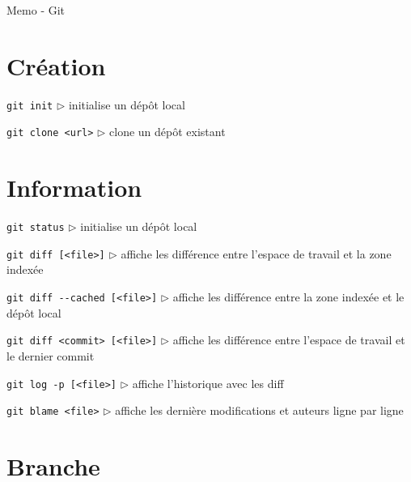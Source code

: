 \documentclass[a4paper,oneside,twocolumn]{article}
\begin{document}
\begin{center}
	\huge Memo - Git
\end{center}


\vspace{-3mm}
\section{Création}
\vspace{-2mm}

\noindent\verb?git init?\linebreak
$\triangleright$ initialise un dépôt local

\noindent\verb?git clone <url>?\linebreak
$\triangleright$ clone un dépôt existant

\vspace{-3mm}
\section{Information}
\vspace{-2mm}

\noindent\verb?git status?\linebreak
$\triangleright$ initialise un dépôt local

\noindent\verb?git diff [<file>]?\linebreak
$\triangleright$ affiche les différence entre l'espace de travail et la zone indexée

\noindent\verb?git diff --cached [<file>]?\linebreak
$\triangleright$ affiche les différence entre la zone indexée et le dépôt local

\noindent\verb?git diff <commit> [<file>]?\linebreak
$\triangleright$ affiche les différence entre l'espace de travail et le dernier commit

\noindent\verb?git log -p [<file>]?\linebreak
$\triangleright$ affiche l'historique avec les diff

\noindent\verb?git blame <file>?\linebreak
$\triangleright$ affiche les dernière modifications et auteurs ligne par ligne

\vspace{-3mm}
\section{Branche}
\vspace{-2mm}
\end{document}
